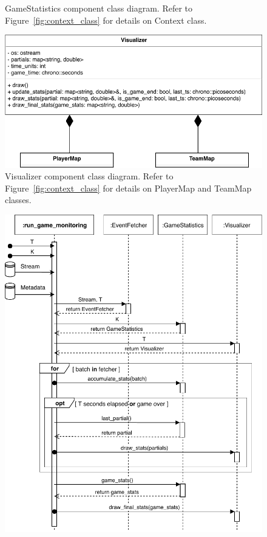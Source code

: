 \documentclass[a4paper, 11pt]{article}
\begin{document}
\begin{appendices}
\begin{figure}[h!]
    \caption{GameStatistics component class diagram. Refer to Figure~\ref{fig:context_class} for details on Context class.}
    \label{fig:game_statistics_class}
\end{figure}
\begin{figure}[h!]
    \centering
    \includegraphics[height=.5\textheight, width=1\textwidth, keepaspectratio]{UML/visualizer_class_diagram.pdf}
    \caption{Visualizer component class diagram. Refer to Figure~\ref{fig:context_class} for details on PlayerMap and TeamMap classes.}
    \label{fig:visualizer_class}
\end{figure}
\begin{figure}
    \centering
    \includegraphics[height=.85\textheight]{UML/top_level_seq.pdf}

\end{figure}
\end{appendices}
\end{document}
